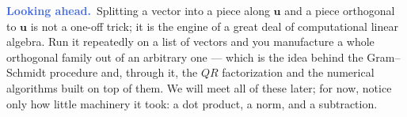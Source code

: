 \documentclass[11pt]{article}
\theoremstyle{definition}
\theoremstyle{remark}
\newcommand{\lookahead}{\par\smallskip\noindent
  \textbf{\sffamily\textcolor{RoyalBlue}{Looking ahead.}}\ \ignorespaces}
\newcommand{\vc}[1]{\mathbf{#1}}
\begin{document}
\lookahead Splitting a vector into a piece along $\vc{u}$ and a piece orthogonal
to $\vc{u}$ is not a one-off trick; it is the engine of a great deal of
computational linear algebra. Run it repeatedly on a list of vectors and you
manufacture a whole orthogonal family out of an arbitrary one --- which is the
idea behind the Gram--Schmidt procedure and, through it, the $QR$ factorization
and the numerical algorithms built on top of them. We will meet all of these
later; for now, notice only how little machinery it took: a dot product, a
norm, and a subtraction.
\end{document}
